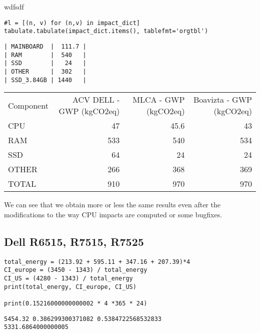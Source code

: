 \documentclass[11pt]{article}
\begin{document}
wdfsdf

\begin{verbatim}
#l = [(n, v) for (n,v) in impact_dict]
tabulate.tabulate(impact_dict.items(), tablefmt='orgtbl')
\end{verbatim}

\begin{verbatim}
| MAINBOARD  |  111.7 |
| RAM        |  540   |
| SSD        |   24   |
| OTHER      |  302   |
| SSD_3.84GB | 1440   |
\end{verbatim}



\begin{center}
\begin{tabular}{lrrr}
Component & ACV DELL - GWP (kgCO2eq) & MLCA - GWP (kgCO2eq) & Boavizta - GWP (kgCO2eq)\\
CPU & 47 & 45.6 & 43\\
RAM & 533 & 540 & 534\\
SSD & 64 & 24 & 24\\
OTHER & 266 & 368 & 369\\
TOTAL & 910 & 970 & 970\\
\end{tabular}
\end{center}

We can see that we obtain more or less the same results even after the
modifications to the way CPU impacts are computed or some bugfixes.

\begin{center}

\end{center}


\subsection{Dell R6515, R7515, R7525}
\label{sec:org9d2353c}

\begin{verbatim}
total_energy = (213.92 + 595.11 + 347.16 + 207.39)*4
CI_europe = (3450 - 1343) / total_energy
CI_US = (4280 - 1343) / total_energy 
print(total_energy, CI_europe, CI_US)

print(0.15216000000000002 * 4 *365 * 24)
\end{verbatim}

\begin{verbatim}
5454.32 0.386299300371082 0.5384722568532833
5331.6864000000005
\end{verbatim}
\end{document}
